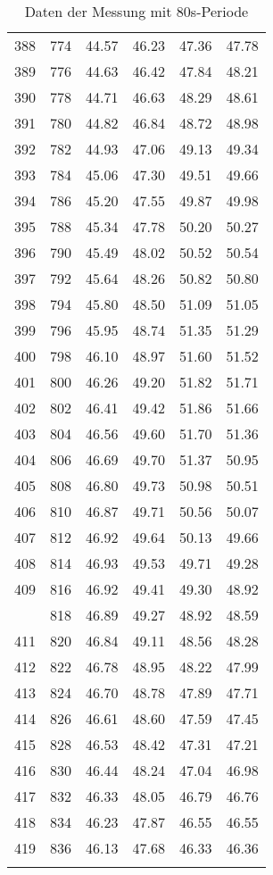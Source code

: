 \begin{longtable}{rrllll}
		388 & 774 & 44.57 & 46.23 & 47.36 & 47.78 \\ 
		389 & 776 & 44.63 & 46.42 & 47.84 & 48.21 \\ 
		390 & 778 & 44.71 & 46.63 & 48.29 & 48.61 \\ 
		391 & 780 & 44.82 & 46.84 & 48.72 & 48.98 \\ 
		392 & 782 & 44.93 & 47.06 & 49.13 & 49.34 \\ 
		393 & 784 & 45.06 & 47.30 & 49.51 & 49.66 \\ 
		394 & 786 & 45.20 & 47.55 & 49.87 & 49.98 \\ 
		395 & 788 & 45.34 & 47.78 & 50.20 & 50.27 \\ 
		396 & 790 & 45.49 & 48.02 & 50.52 & 50.54 \\ 
		397 & 792 & 45.64 & 48.26 & 50.82 & 50.80 \\ 
		398 & 794 & 45.80 & 48.50 & 51.09 & 51.05 \\ 
		399 & 796 & 45.95 & 48.74 & 51.35 & 51.29 \\ 
		400 & 798 & 46.10 & 48.97 & 51.60 & 51.52 \\ 
		401 & 800 & 46.26 & 49.20 & 51.82 & 51.71 \\ 
		402 & 802 & 46.41 & 49.42 & 51.86 & 51.66 \\ 
		403 & 804 & 46.56 & 49.60 & 51.70 & 51.36 \\ 
		404 & 806 & 46.69 & 49.70 & 51.37 & 50.95 \\ 
		405 & 808 & 46.80 & 49.73 & 50.98 & 50.51 \\ 
		406 & 810 & 46.87 & 49.71 & 50.56 & 50.07 \\ 
		407 & 812 & 46.92 & 49.64 & 50.13 & 49.66 \\ 
		408 & 814 & 46.93 & 49.53 & 49.71 & 49.28 \\ 
		409 & 816 & 46.92 & 49.41 & 49.30 & 48.92 \\ 
		\pagebreak
		410 & 818 & 46.89 & 49.27 & 48.92 & 48.59 \\ 
		411 & 820 & 46.84 & 49.11 & 48.56 & 48.28 \\ 
		412 & 822 & 46.78 & 48.95 & 48.22 & 47.99 \\ 
		413 & 824 & 46.70 & 48.78 & 47.89 & 47.71 \\ 
		414 & 826 & 46.61 & 48.60 & 47.59 & 47.45 \\ 
		415 & 828 & 46.53 & 48.42 & 47.31 & 47.21 \\ 
		416 & 830 & 46.44 & 48.24 & 47.04 & 46.98 \\ 
		417 & 832 & 46.33 & 48.05 & 46.79 & 46.76 \\ 
		418 & 834 & 46.23 & 47.87 & 46.55 & 46.55 \\ 
		419 & 836 & 46.13 & 47.68 & 46.33 & 46.36 \\ 
	\caption{Daten der Messung mit 80s-Periode}
	\label{Messung2}
\end{longtable}
